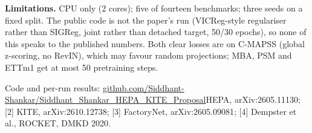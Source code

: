 \documentclass[10pt]{article}
\begin{document}
\textbf{Limitations.} CPU only (2 cores); five of fourteen benchmarks; three seeds on a fixed split. The public code is not the paper's run (VICReg-style regulariser rather than SIGReg, joint rather than detached target, 50/30 epochs), so none of this speaks to the published numbers. Both clear losses are on C-MAPSS (global z-scoring, no RevIN), which may favour random projections; MBA, PSM and ETTm1 get at most 50 pretraining steps.

{\small Code and per-run results: \href{https://github.com/Siddhant-Shankar/Siddhant_Shankar_HEPA_KITE_Proposal}{github.com/Siddhant-Shankar/Siddhant\_Shankar\_HEPA\_KITE\_Proposal}\newline [1] HEPA, arXiv:2605.11130; [2] KITE, arXiv:2610.12738; [3] FactoryNet, arXiv:2605.09081; [4] Dempster et al., ROCKET, DMKD 2020.}
\end{document}

